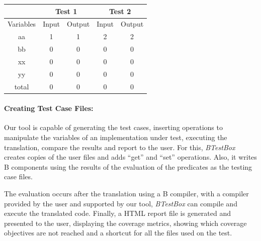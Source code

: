 \documentclass[runningheads]{llncs}
\begin{document}
\begin{center}
\begin{tabular}{c|c|c|c|c|}
\cline{2-5}
                                & \multicolumn{2}{c|}{Test 1} & \multicolumn{2}{c|}{Test 2} \\ \hline
\multicolumn{1}{|c|}{Variables} & Input        & Output       & Input        & Output       \\ \hline
\multicolumn{1}{|c|}{aa}        & 1            & 1            & 2            & 2            \\ \hline
\multicolumn{1}{|c|}{bb}        & 0            & 0            & 0            & 0            \\ \hline
\multicolumn{1}{|c|}{xx}        & 0            & 0            & 0            & 0            \\ \hline
\multicolumn{1}{|c|}{yy}        & 0            & 0            & 0            & 0            \\ \hline
\multicolumn{1}{|c|}{total}     & 0            & 0            & 0            & 0            \\ \hline
\end{tabular}
\end{center}

\paragraph{Creating Test Case Files:} Our tool is capable of generating the test cases, inserting operations to manipulate the variables of an implementation under test, executing the translation, compare the results and report to the user. For this, \textit{BTestBox} creates copies of the user files and adds ``get'' and ``set'' operations. Also, it writes B components using the results of the evaluation of the predicates as the testing case files.

The evaluation occurs after the translation using a B compiler, with a compiler provided by the user and supported by our tool, \textit{BTestBox} can compile and execute the translated code. Finally, a HTML report file is generated and presented to the user, displaying the coverage metrics, showing which coverage objectives are not reached and a shortcut for all the files used on the test.
\end{document}
